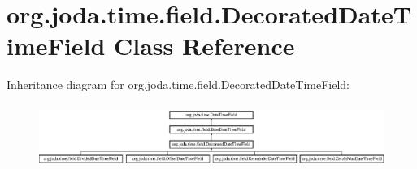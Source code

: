 \hypertarget{classorg_1_1joda_1_1time_1_1field_1_1_decorated_date_time_field}{\section{org.\-joda.\-time.\-field.\-Decorated\-Date\-Time\-Field Class Reference}
\label{classorg_1_1joda_1_1time_1_1field_1_1_decorated_date_time_field}
}
Inheritance diagram for org.\-joda.\-time.\-field.\-Decorated\-Date\-Time\-Field\-:\begin{figure}[H]
\begin{center}
\leavevmode
\includegraphics[height=2.105263cm]{classorg_1_1joda_1_1time_1_1field_1_1_decorated_date_time_field}
\end{center}
\end{figure}
